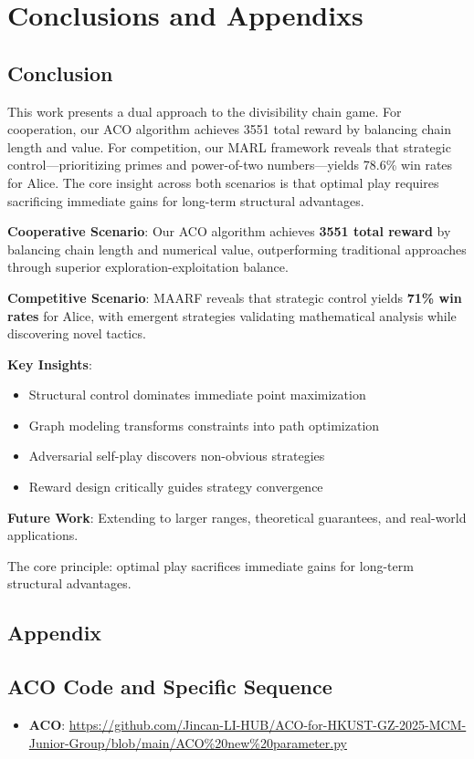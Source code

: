 \documentclass[twocolumn, a4paper]{article}
\begin{document}
\section{Conclusions and Appendixs}
\subsection{Conclusion}
This work presents a dual approach to the divisibility chain game. For cooperation, our ACO algorithm achieves 3551 total reward by balancing chain length and value. For competition, our MARL framework reveals that strategic control—prioritizing primes and power-of-two numbers—yields 78.6\% win rates for Alice. The core insight across both scenarios is that optimal play requires sacrificing immediate gains for long-term structural advantages.

\textbf{Cooperative Scenario}: Our ACO algorithm achieves \textbf{3551 total reward} by balancing chain length and numerical value, outperforming traditional approaches through superior exploration-exploitation balance.

\textbf{Competitive Scenario}: MAARF reveals that strategic control yields \textbf{71\% win rates} for Alice, with emergent strategies validating mathematical analysis while discovering novel tactics.

\textbf{Key Insights}:
\begin{itemize}
\item Structural control dominates immediate point maximization
\item Graph modeling transforms constraints into path optimization  
\item Adversarial self-play discovers non-obvious strategies
\item Reward design critically guides strategy convergence
\end{itemize}

\textbf{Future Work}: Extending to larger ranges, theoretical guarantees, and real-world applications.

The core principle: optimal play sacrifices immediate gains for long-term structural advantages.
\subsection{Appendix}
\small %
\appendix %
\subsection{ACO Code and Specific Sequence} 
\label{app:aco_code} 
\begin{itemize}
    \item \textbf{ACO}: \url{https://github.com/Jincan-LI-HUB/ACO-for-HKUST-GZ-2025-MCM-Junior-Group/blob/main/ACO%20new%20parameter.py}
\end{itemize}
\end{document}
